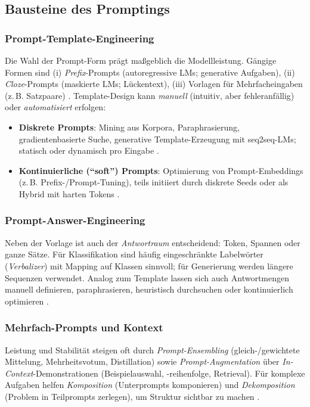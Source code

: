 \subsection{Bausteine des Promptings}
\subsubsection{Prompt-Template-Engineering}
Die Wahl der Prompt-Form prägt maßgeblich die Modellleistung. Gängige Formen sind (i) \emph{Prefix}-Prompts (auto\-regressive LMs; generative Aufgaben), (ii) \emph{Cloze}-Prompts (maskierte LMs; Lückentext), (iii) Vorlagen für Mehrfacheingaben (z.\,B. Satzpaare) \cite{liu2023survey}. Template-Design kann \emph{manuell} (intuitiv, aber fehleranfällig) oder \emph{automatisiert} erfolgen:
\begin{itemize}
  \item \textbf{Diskrete Prompts}: Mining aus Korpora, Paraphrasierung, gradientenbasierte Suche, generative Template-Erzeugung mit seq2seq-LMs; statisch oder dynamisch pro Eingabe \cite{liu2023survey}.
  \item \textbf{Kontinuierliche (``soft'') Prompts}: Optimierung von Prompt-Embeddings (z.\,B. Prefix-/Prompt-Tuning), teils initiiert durch diskrete Seeds oder als Hybrid mit harten Tokens \cite{liu2023survey}.
\end{itemize}

\subsubsection{Prompt-Answer-Engineering}
Neben der Vorlage ist auch der \emph{Antwortraum} entscheidend: Token, Spannen oder ganze Sätze. Für Klassifikation sind häufig eingeschränkte Labelwörter (\emph{Verbalizer}) mit Mapping auf Klassen sinnvoll; für Generierung werden längere Sequenzen verwendet. Analog zum Template lassen sich auch Antwortmengen manuell definieren, paraphrasieren, heuristisch durchsuchen oder kontinuierlich optimieren \cite{liu2023survey}.

\subsubsection{Mehrfach-Prompts und Kontext}
Leistung und Stabilität steigen oft durch \emph{Prompt-Ensembling} (gleich-/gewichtete Mittelung, Mehrheitsvotum, Distillation) sowie \emph{Prompt-Augmentation} über \emph{In-Context}-Demonstrationen (Beispielauswahl, -reihenfolge, Retrieval)\cite{liu2023survey}. Für komplexe Aufgaben helfen \emph{Komposition} (Unterprompts komponieren) und \emph{Dekomposition} (Problem in Teilprompts zerlegen), um Struktur sichtbar zu machen \cite{liu2023survey}.

